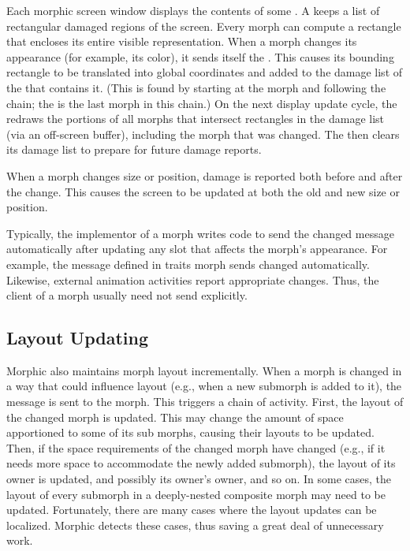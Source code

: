 \documentclass[letterpaper,10pt,english]{sphinxmanual}
\begin{document}
Each morphic screen window displays the contents of some . A  keeps a list of rectangular \sphinxquotedblleft{}damaged\sphinxquotedblright{} regions of the screen. Every morph can compute a rectangle that encloses its entire visible representation. When a morph changes its appearance (for example, its color), it sends itself the  . This causes its bounding rectangle to be translated into global coordinates and added to the damage list of the  that contains it. (This  is found by starting at the morph and following the  chain; the  is the last morph in this chain.) On the next display update cycle, the  redraws the portions of all morphs that intersect rectangles in the damage list (via an off-screen buffer), including the morph that was changed. The  then clears its damage list to prepare for future damage reports.

When a morph changes size or position, damage is reported both before and after the change. This causes the screen to be updated at both the old and new size or position.

Typically, the implementor of a morph writes code to send the changed message automatically after updating any slot that affects the morph's appearance. For example, the  message defined in traits morph sends changed automatically. Likewise, external animation activities report appropriate changes. Thus, the client of a morph usually need not send  explicitly.


\subsection{Layout Updating}
\label{\detokenize{morphic:layout-updating}}
Morphic also maintains morph layout incrementally. When a morph is changed in a way that could influence layout (e.g., when a new submorph is added to it), the message  is sent to the morph. This triggers a chain of activity. First, the layout of the changed morph is updated. This may change the amount of space apportioned to some of its sub morphs, causing their layouts to be updated. Then, if the space requirements of the changed morph have changed (e.g., if it needs more space to accommodate the newly added submorph), the layout of its owner is updated, and possibly its owner's owner, and so on. In some cases, the layout of every submorph in a deeply-nested composite morph may need to be updated. Fortunately, there are many cases where the layout updates can be localized. Morphic detects these cases, thus saving a great deal of unnecessary work.
\end{document}

